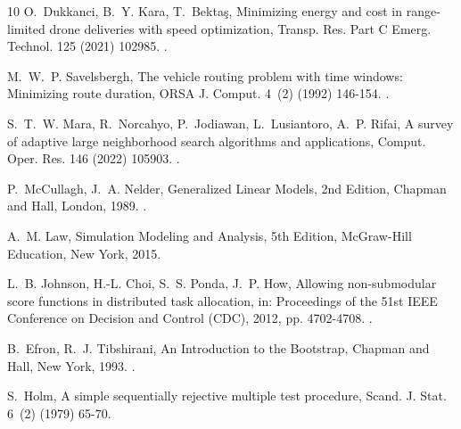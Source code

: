 \documentclass[a4paper,fleqn]{cas-dc}
\begin{document}
\begin{thebibliography}{10}
O.~Dukkanci, B.~Y. Kara, T.~Bekta{\c{s}}, Minimizing energy and cost in
  range-limited drone deliveries with speed optimization, Transp. Res. Part C
  Emerg. Technol. 125 (2021) 102985.
\newblock \href {https://doi.org/10.1016/j.trc.2021.102985}
  {}.

M.~W.~P. Savelsbergh, The vehicle routing problem with time windows: Minimizing
  route duration, ORSA J. Comput. 4~(2) (1992) 146-154.
\newblock \href {https://doi.org/10.1287/ijoc.4.2.146}
  {}.

S.~T.~W. Mara, R.~Norcahyo, P.~Jodiawan, L.~Lusiantoro, A.~P. Rifai, A survey
  of adaptive large neighborhood search algorithms and applications, Comput.
  Oper. Res. 146 (2022) 105903.
\newblock \href {https://doi.org/10.1016/j.cor.2022.105903}
  {}.

P.~McCullagh, J.~A. Nelder, Generalized Linear Models, 2nd Edition, Chapman and
  Hall, London, 1989.
\newblock \href {https://doi.org/10.1007/978-1-4899-3242-6}
  {}.

A.~M. Law, Simulation Modeling and Analysis, 5th Edition, McGraw-Hill
  Education, New York, 2015.

L.~B. Johnson, H.-L. Choi, S.~S. Ponda, J.~P. How, Allowing non-submodular
  score functions in distributed task allocation, in: Proceedings of the 51st
  IEEE Conference on Decision and Control (CDC), 2012, pp. 4702-4708.
\newblock \href {https://doi.org/10.1109/CDC.2012.6425867}
  {}.

B.~Efron, R.~J. Tibshirani, An Introduction to the Bootstrap, Chapman and Hall,
  New York, 1993.
\newblock \href {https://doi.org/10.1007/978-1-4899-4541-9}
  {}.

S.~Holm, A simple sequentially rejective multiple test procedure, Scand. J.
  Stat. 6~(2) (1979) 65-70.

\end{thebibliography}
\end{document}
